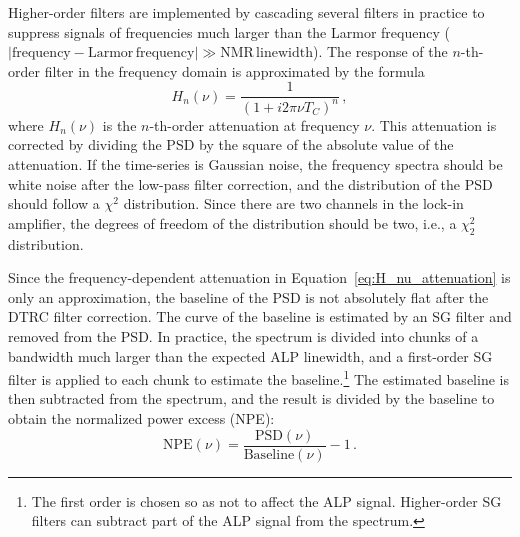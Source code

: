 Higher-order filters are implemented by cascading several filters in practice to suppress signals of frequencies much larger than the Larmor frequency ($|\mathrm{frequency}-\mathrm{Larmor\, frequency}|\gg\mathrm{NMR\, linewidth}$).
The response of the $n$-th-order filter in the frequency domain is approximated by the formula
\begin{equation}
    H_n(\nu)=\frac{1}{(1+i2\pi\nu T_C)^n}
    \,,
    \label{eq:H_nu_attenuation}
\end{equation}
where $H_n(\nu)$ is the $n$-th-order attenuation at frequency $\nu$.
This attenuation is corrected by dividing the PSD by the square of the absolute value of the attenuation.
If the time-series is Gaussian noise, the frequency spectra should be white noise after the low-pass filter correction, and the distribution of the PSD should follow a $\chi^2$ distribution. Since there are two channels in the lock-in amplifier, the degrees of freedom of the distribution should be two, i.e., a $\chi^2_2$ distribution.

Since the frequency-dependent attenuation in Equation~\eqref{eq:H_nu_attenuation} is only an approximation, the baseline of the PSD is not absolutely flat after the DTRC filter correction.
The curve of the baseline is estimated by an SG filter and removed from the PSD.
In practice, the spectrum is divided into chunks of a bandwidth much larger than the expected ALP linewidth, and a first-order SG filter is applied to each chunk to estimate the baseline.\footnote{The first order is chosen so as not to affect the ALP signal. Higher-order SG filters can subtract part of the ALP signal from the spectrum.}
The estimated baseline is then subtracted from the spectrum, and the result is divided by the baseline to obtain the normalized power excess (NPE):
\begin{equation}
  \mathrm{NPE}(\nu) = \frac{\mathrm{PSD}(\nu)}{\mathrm{Baseline}(\nu)} - 1
  \,.
  \label{eq:NPE_baseline}
\end{equation}


